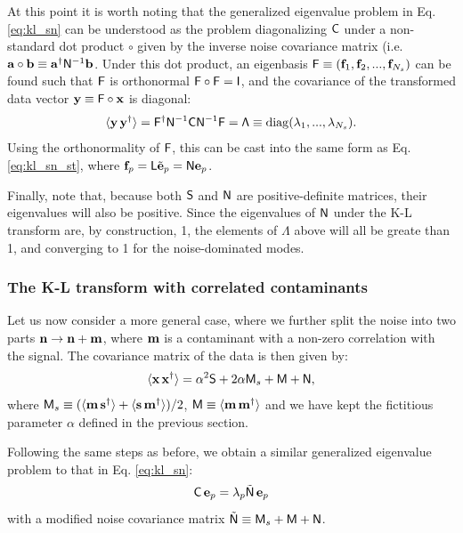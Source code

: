 \documentclass[twocolumn,amsfont,amssymb,amsmath, showpacs,balancelastpage, nofootinbib]{revtex4-1}
\begin{document}
      At this point it is worth noting that the generalized eigenvalue problem in Eq. \ref{eq:kl_sn} can be understood as the problem diagonalizing ${\sf C}$ under a non-standard dot product $\circ$ given by the inverse noise covariance matrix (i.e. ${\bf a}\circ{\bf b}\equiv{\bf a}^\dag{\sf N}^{-1}{\bf b}$. Under this dot product, an eigenbasis ${\sf F}\equiv({\bf f}_1,{\bf f}_2,...,{\bf f}_{N_s})$ can be found such that ${\sf F}$ is orthonormal ${\sf F}\circ{\sf F}={\sf I}$, and the covariance of the transformed data vector ${\bf y}\equiv{\sf F}\circ{\bf x}$ is diagonal:
      \begin{equation}\label{eq:kl_sn_prod}
        \langle{\bf y}\,{\bf y}^\dag\rangle={\sf F}^\dag{\sf N}^{-1}{\sf C}{\sf N}^{-1}{\sf F}={\sf \Lambda}\equiv{\rm diag}(\lambda_1,...,\lambda_{N_s}).
      \end{equation}
      Using the orthonormality of ${\sf F}$, this can be cast into the same form as Eq. \ref{eq:kl_sn_st}, where ${\bf f}_p={\sf L}\tilde{\bf e}_p={\sf N}{\bf e}_p$.
      
      Finally, note that, because both ${\sf S}$ and ${\sf N}$ are positive-definite matrices, their eigenvalues will also be positive. Since the eigenvalues of ${\sf N}$ under the K-L transform are, by construction, 1, the elements of $\Lambda$ above will all be greate than 1, and converging to 1 for the noise-dominated modes.
      
    \subsubsection{The K-L transform with correlated contaminants}\label{sssec:method.klbasis.cr}
      Let us now consider a more general case, where we further split the noise into two parts ${\bf n}\rightarrow{\bf n}+{\bf m}$, where ${\bf m}$ is a contaminant with a non-zero correlation with the signal. The covariance matrix of the data is then given by:
      \begin{equation}
        \langle{\bf x}\,{\bf x}^\dag\rangle=\alpha^2{\sf S}+2\alpha{\sf M}_s+{\sf M}+{\sf N},
      \end{equation}
      where ${\sf M}_s\equiv(\langle{\bf m}\,{\bf s}^\dag\rangle+\langle{\bf s}\,{\bf m}^\dag\rangle)/2$, ${\sf M}\equiv\langle{\bf m}\,{\bf m}^\dag\rangle$ and we have kept the fictitious parameter $\alpha$ defined in the previous section.
      
      Following the same steps as before, we obtain a similar generalized eigenvalue problem to that in Eq. \ref{eq:kl_sn}:
      \begin{equation}
        {\sf C}\,{\bf e}_p=\lambda_p\tilde{\sf N}\,{\bf e}_p
      \end{equation}
      with a modified noise covariance matrix $\tilde{\sf N}\equiv{\sf M}_s+{\sf M}+{\sf N}$. 
\end{document}

